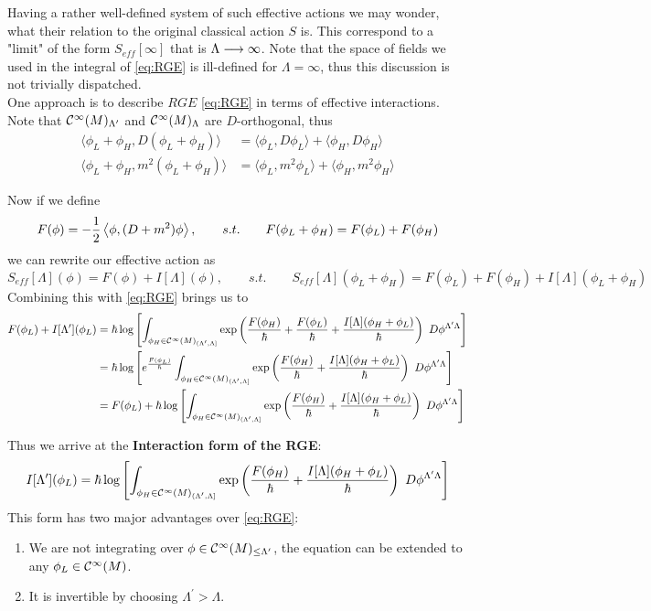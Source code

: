 Having a rather well-defined system of such effective actions we may wonder, what their relation to the original classical action $S$ is. This correspond to a "limit" of the form $S_{eff}[\infty]$ that is $\Lambda \longrightarrow \infty$. Note that the space of fields we used in the integral of \eqref{eq:RGE} is ill-defined for $\Lambda = \infty$, thus this discussion is not trivially dispatched.\\

One approach is to describe $RGE$ \eqref{eq:RGE} in terms of effective interactions. Note that $\mathcal{C}^{\infty}(M)_{\Lambda^\prime}$ and $\mathcal{C}^{\infty}(M)_{\Lambda}$ are $D$-orthogonal, thus
\begin{align*}
  \langle \phi_L + \phi_H , D(\phi_L + \phi_H) \rangle &= \langle \phi_L , D\phi_L \rangle + \langle \phi_H , D\phi_H \rangle \\
  \langle \phi_L + \phi_H , m^2(\phi_L + \phi_H) \rangle &= \langle \phi_L, m^2 \phi_L \rangle + \langle \phi_H, m^2 \phi_H \rangle
\end{align*}

Now if we define
$$ F(\phi) = - \frac{1}{2} \pair{\phi}{(D+m^2)\phi}, \quad \quad s.t. \quad \quad F(\phi_L + \phi_H) = F(\phi_L) + F(\phi_H) $$
we can rewrite our effective action as
$$ S_{eff}[\Lambda](\phi) = F(\phi) + I[\Lambda](\phi), \quad \quad s.t. \quad \quad S_{eff}[\Lambda](\phi_L + \phi_H) = F(\phi_L) + F(\phi_H) + I[\Lambda](\phi_L + \phi_H)$$
Combining this with \eqref{eq:RGE} brings us to
\begin{align*}
  F(\phi_L) + I[\Lambda^\prime](\phi_L) &= \hbar \log \left[  \int_{\phi_H \in \Ci(M)_{(\Lambda^\prime,\Lambda]}} \exp\left(\frac{F(\phi_H)}{\hbar} + \frac{F(\phi_L)}{\hbar} + \frac{I[\Lambda](\phi_H + \phi_L)}{\hbar} \right) \ D\phi^{\Lambda^\prime \Lambda} \right] \\
  &= \hbar \log \left[ e^{\frac{F(\phi_L)}{\hbar}} \int_{\phi_H \in \Ci(M)_{(\Lambda^\prime,\Lambda]}} \exp\left(\frac{F(\phi_H)}{\hbar} + \frac{I[\Lambda](\phi_H + \phi_L)}{\hbar} \right) \ D\phi^{\Lambda^\prime \Lambda} \right] \\
  &= F(\phi_L) + \hbar \log \left[ \int_{\phi_H \in \Ci(M)_{(\Lambda^\prime,\Lambda]}} \exp\left(\frac{F(\phi_H)}{\hbar} + \frac{I[\Lambda](\phi_H + \phi_L)}{\hbar} \right) \ D\phi^{\Lambda^\prime \Lambda} \right]
\end{align*}

Thus we arrive at the \textbf{Interaction form of the RGE}:
\begin{align}
\label{eq:RGE_interaction}
  I[\Lambda^\prime](\phi_L) = \hbar \log \left[  \int_{\phi_H \in \Ci(M)_{(\Lambda^\prime,\Lambda]}} \exp\left(\frac{F(\phi_H)}{\hbar} + \frac{I[\Lambda](\phi_H + \phi_L)}{\hbar} \right) \ D\phi^{\Lambda^\prime \Lambda} \right]
\end{align}
This form has two major advantages over \eqref{eq:RGE}:
\begin{enumerate}
  \item We are not integrating over $\phi \in \Ci(M)_{\leq \Lambda^\prime}$, the equation can be extended to any $\phi_L \in \Ci(M)$.

  \item It is invertible by choosing $\Lambda^\prime > \Lambda$.
\end{enumerate}

